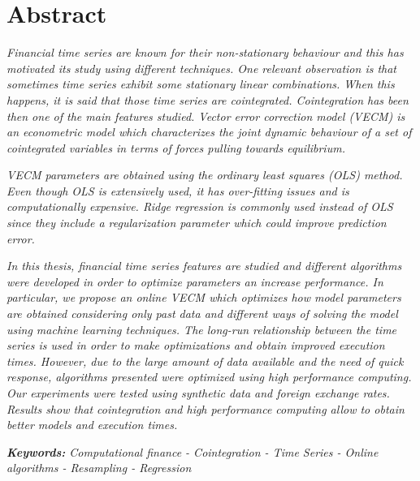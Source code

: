 \chapter*{Abstract}

\emph{Financial time series are known for their non-stationary behaviour and
this has motivated its study using different techniques. 
One relevant observation is that sometimes time series exhibit some stationary
linear combinations. When this happens, it is said that those time series are
cointegrated.  Cointegration has been then one of the main features studied.
Vector error correction model (VECM) is an econometric model which characterizes
the joint dynamic behaviour of a set of cointegrated variables in terms of
forces pulling towards equilibrium.}

\emph{VECM parameters are obtained using the ordinary least squares (OLS)
method.  Even though OLS is extensively used, it has over-fitting
issues and is computationally expensive. Ridge regression is commonly used
instead of OLS since they include a regularization parameter which could improve
prediction error.}

\emph{In this thesis, financial time series features are studied and different
algorithms were developed in order to optimize parameters an increase performance.
In particular, we propose an online VECM which optimizes how model parameters
are obtained considering only past data and different ways of solving the model
using machine learning techniques.  
The long-run relationship between the time series is used in order to make
optimizations and obtain improved execution times. However, due to the large
amount of data available and the need of quick response, algorithms presented
were optimized using high performance computing.
Our experiments were tested using synthetic data and foreign exchange rates.
Results show that cointegration and high performance computing allow to obtain
better models and execution times.}

\vspace{0.8cm}

\emph{\textbf{Keywords:} Computational finance  - Cointegration  - Time Series - 
Online algorithms - Resampling  - Regression}


